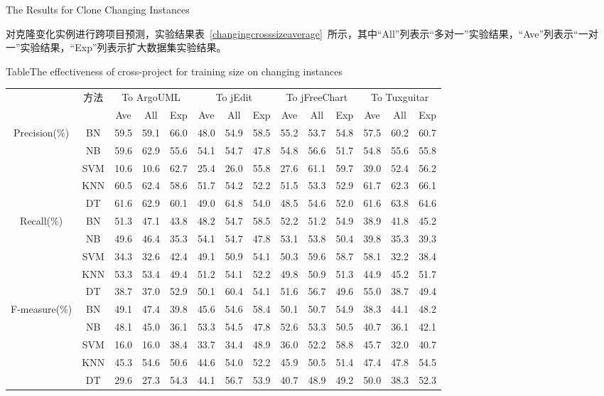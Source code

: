 {The Results for Clone Changing Instances}

对克隆变化实例进行跨项目预测，实验结果表~\ref{changingcrosssizeaverage}~所示，其中“All”列表示“多对一”实验结果，“Ave”列表示“一对一”实验结果，“Exp”列表示扩大数据集实验结果。

\begin{table} [h]
{Table$\!$}{The effectiveness of cross-project for training size on changing instances}
\vspace{0.5em}
\centering
\footnotesize
\begin{tabular}{cccccccccccccc}
\toprule[1.5pt]
~\multirow{2}{*}{评估指标}&\multirow{2}{*}{方法}&\multicolumn{3}{c}{To ArgoUML}&\multicolumn{3}{c}{To jEdit}&\multicolumn{3}{c}{To jFreeChart}&\multicolumn{3}{c}{To  Tuxguitar}\\
~&~&{Ave}&{All}&{Exp}&{Ave}&{All}&{Exp}&{Ave}&{All}&{Exp}&{Ave}&{All}&{Exp}\\
\midrule[1pt]
\multirow{5}{*}{Precision(\%)}
&BN&59.5&59.1&66.0&48.0&54.9&58.5&55.2&53.7&54.8&57.5&60.2&60.7\\
&NB&59.6&62.9&55.6&54.1&54.7&47.8&54.8&56.6&51.7&54.8&55.6&55.8\\
&SVM&10.6&10.6&62.7&25.4&26.0&55.8&	27.6&61.1&59.7&	39.0&52.4&56.2\\
&KNN&60.5&62.4&58.6&51.7&54.2&52.2&51.5&53.3&52.9&61.7&62.3&66.1\\
&DT	&61.6&	62.9&60.1&49.0&64.8&54.0&48.5&54.6&52.0&61.6&63.8&64.6\\
\multirow{5}{*}{Recall(\%)}								
&BN&51.3&47.1&43.8&48.2&54.7&58.5&52.2&51.2&54.9&38.9&41.8&45.2\\
&NB&49.6&46.4&35.3&54.1&54.7&47.8&53.1&53.8&50.4&39.8&35.3&39.3\\
&SVM&34.3&32.6&42.4&49.1&50.9&54.1&50.3&59.6&58.7&58.1&32.2&38.4\\
&KNN&53.3&53.4&49.4&51.2&54.1&52.2&49.8&50.9&51.3&44.9&45.2&51.7\\
&DT	&38.7&37.0&52.9&50.1&60.4&54.1&51.6&	56.7&49.6&	55.0&	38.7&49.4\\
\multirow{5}{*}{F-measure(\%)}								
&BN&	49.1&47.4&39.8&	45.6&	54.6&58.4&50.1&50.7&54.9&38.3&44.1&48.2\\
&NB&	48.1&	45.0&36.1&53.3&54.5&47.8&52.6&53.3&50.5&40.7&36.1&42.1\\
&SVM&	16.0&16.0&38.4&33.7&34.4&48.9&36.0&52.2&58.8&45.7&32.0&40.7\\
&KNN&	45.3&	54.6&50.6&44.6&54.0&52.2&45.9&50.5&51.4&47.4&47.8&54.5\\
&DT&	29.6&27.3&54.3&44.1&56.7&53.9&40.7&48.9&49.2&50.0&38.3&52.3\\
\bottomrule[1.5pt]
\end{tabular}
\end{table}

